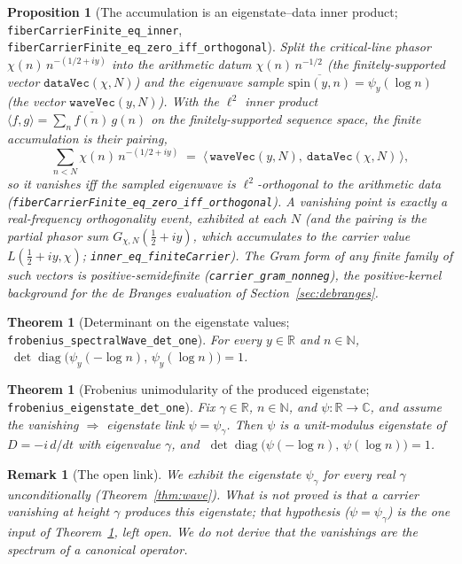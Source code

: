 \documentclass[11pt]{article}
\newtheorem{theorem}[definition]{Theorem}
\newtheorem{proposition}[definition]{Proposition}
\newtheorem{remark}[definition]{Remark}
\DeclareMathOperator{\diag}{diag}
\newcommand{\C}{\mathbb{C}}
\newcommand{\R}{\mathbb{R}}
\newcommand{\N}{\mathbb{N}}
\newcommand{\conj}[1]{\overline{#1}}
\newcommand{\code}[1]{\texttt{#1}}
\begin{document}
\begin{proposition}[The accumulation is an eigenstate--data inner product; \code{fiberCarrierFinite\_eq\_inner}, \code{fiberCarrierFinite\_eq\_zero\_iff\_orthogonal}]\label{prop:ortho}
Split the critical-line phasor $\chi(n)\,n^{-(1/2+iy)}$ into the arithmetic datum
$\chi(n)\,n^{-1/2}$ (the finitely-supported vector $\code{dataVec}(\chi,N)$) and the eigenwave sample
$\conj{\mathrm{spin}(y,n)}=\psi_y(\log n)$ (the vector $\code{waveVec}(y,N)$). With the $\ell^2$ inner
product $\langle f,g\rangle=\sum_n\conj{f(n)}\,g(n)$ on the finitely-supported sequence space, the
finite accumulation is their pairing,
\[
  \sum_{n<N}\chi(n)\,n^{-(1/2+iy)} \;=\; \bigl\langle\,\code{waveVec}(y,N),\ \code{dataVec}(\chi,N)\,\bigr\rangle ,
\]
so it vanishes \emph{iff} the sampled eigenwave is $\ell^2$-orthogonal to the arithmetic data
(\code{fiberCarrierFinite\_eq\_zero\_iff\_orthogonal}). A vanishing point is exactly a real-frequency
orthogonality event, exhibited at each $N$ (and the pairing is the partial phasor sum
$G_{\chi,N}(\tfrac12+iy)$, which accumulates to the carrier value $L(\tfrac12+iy,\chi)$;
\code{inner\_eq\_finiteCarrier}). The Gram form of any finite family of such vectors is
positive-semidefinite (\code{carrier\_gram\_nonneg}), the positive-kernel background for the de Branges
evaluation of Section~\ref{sec:debranges}.
\end{proposition}

\begin{theorem}[Determinant on the eigenstate values; \code{frobenius\_spectralWave\_det\_one}]\label{thm:wavedet}
For every $y\in\R$ and $n\in\N$, $\;\det\diag\!\big(\psi_y(-\log n),\,\psi_y(\log n)\big)=1$.
\end{theorem}

\begin{theorem}[Frobenius unimodularity of the produced eigenstate; \code{frobenius\_eigenstate\_det\_one}]\label{thm:eigdet}
Fix $\gamma\in\R$, $n\in\N$, and $\psi:\R\to\C$, and \emph{assume} the vanishing $\Rightarrow$
eigenstate link $\psi=\psi_\gamma$. Then $\psi$ is a unit-modulus eigenstate of $D=-i\,d/dt$ with
eigenvalue $\gamma$, and $\;\det\diag\!\big(\psi(-\log n),\,\psi(\log n)\big)=1$.
\end{theorem}

\begin{remark}[The open link]\label{rem:openlink}
We exhibit the eigenstate $\psi_\gamma$ for every real $\gamma$ unconditionally
(Theorem~\ref{thm:wave}). What is \emph{not} proved is that a carrier vanishing at height $\gamma$
\emph{produces} this eigenstate; that hypothesis ($\psi=\psi_\gamma$) is the one input of
Theorem~\ref{thm:eigdet}, left open. We do not derive that the vanishings are the spectrum of a
canonical operator.
\end{remark}
\end{document}
